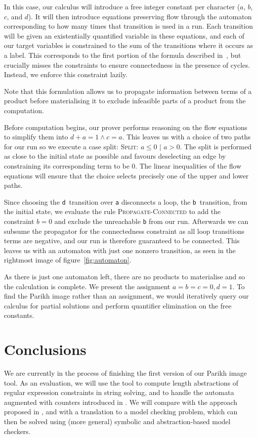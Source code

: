 \documentclass{easychair}
\begin{document}
  In this case, our calculus will introduce a free integer constant per
  character ($a$, $b$, $c$, and $d$). It will then introduce equations
  preserving flow through the automaton corresponding to how many times that
  transition is used in a run. Each transition will be given an
  existentially quantified variable in these equations, and each of our target
  variables is constrained to the sum of the transitions where it occurs as a
  label. This corresponds to the first portion of the formula described
  in~\cite{generate-parikh-image}, but crucially misses the constraints to
  ensure connectedness in the presence of cycles. Instead, we enforce this
  constraint lazily.

  Note that this formulation allows us to propagate information between terms of
  a product before materialising it to exclude infeasible parts of a product from the computation.
  
Before computation begins, our prover performs reasoning on the flow equations
to simplify them into $d + a = 1 \land c = a$. This leaves us with a choice of
two paths for our run so we execute a case split: \textsc{Split}: $a \leq 0$
$\mid$ $a > 0$. The split is performed as close to the initial state as possible
and favours deselecting an edge by constraining its corresponding term to be 0.
The linear inequalities of the flow equations will ensure that the choice
selects precisely one of the upper and lower paths.

Since choosing the \texttt{d}~transition over \texttt{a} disconnects a loop, the \texttt{b}~transition, from the initial state, we evaluate the rule \textsc{Propagate-Connected} to add the constraint $b = 0$ and exclude the unreachable \texttt{b} from our run. Afterwards we can subsume the propagator for the connectedness constraint as all loop transitions terms are negative, and our run is therefore guaranteed to be connected. This leaves us with an automaton with just one nonzero transition, as seen in the rightmost image of figure~\ref{fig:automaton}.

As there is just one automaton left, there are no products to materialise and so
the calculation is complete. We present the assignment $a = b = c = 0, d=1$. To
find the Parikh image rather than an assignment, we would iteratively query
our calculus for partial solutions and perform quantifier elimination on the
free constants.

\section{Conclusions}

We are currently in the process of finishing the first version of our
Parikh image tool. As an evaluation, we will use the tool to compute
length abstractions of regular expression constraints in string
solving, and to handle the automata augmented with counters introduced
in \cite{path-feasibility-strings}. We will compare with the approach
proposed in \cite{generate-parikh-image}, and with a translation to a
model checking problem, which can then be solved using (more general)
symbolic and abstraction-based model checkers.

%
\printbibliography
\end{document}
